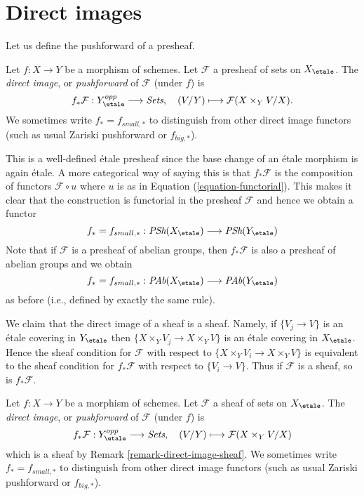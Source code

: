 \section{Direct images}
\label{section-direct-image}

\noindent
Let us define the pushforward of a presheaf.

\begin{definition}
\label{definition-direct-image-presheaf}
Let $f: X\to Y$ be a morphism of schemes.
Let $\mathcal{F} $ a presheaf of sets on $X_\etale$.
The {\it direct image}, or {\it pushforward} of $\mathcal{F}$
(under $f$) is
$$
f_*\mathcal{F} : Y_\etale^{opp} \longrightarrow \textit{Sets}, \quad
(V/Y) \longmapsto \mathcal{F}(X \times_Y V/X).
$$
We sometimes write $f_* = f_{small, *}$ to distinguish from other
direct image functors (such as usual Zariski pushforward or $f_{big, *}$).
\end{definition}

\noindent
This is a well-defined \'etale presheaf since the base change of an \'etale
morphism is again \'etale. A more categorical way of saying this is that
$f_*\mathcal{F}$ is the composition of functors $\mathcal{F} \circ u$
where $u$ is as in Equation (\ref{equation-functorial}). This makes it
clear that the construction is functorial in the presheaf
$\mathcal{F}$ and hence we obtain a functor
$$
f_* = f_{small, *} :
\textit{PSh}(X_\etale)
\longrightarrow
\textit{PSh}(Y_\etale)
$$
Note that if $\mathcal{F}$ is a presheaf of abelian groups, then
$f_*\mathcal{F}$ is also a presheaf of abelian groups and we obtain
$$
f_* = f_{small, *} :
\textit{PAb}(X_\etale)
\longrightarrow
\textit{PAb}(Y_\etale)
$$
as before (i.e., defined by exactly the same rule).

\begin{remark}
\label{remark-direct-image-sheaf}
We claim that the direct image of a sheaf is a sheaf.
Namely, if $\{V_j \to V\}$ is an \'etale covering in $Y_\etale$
then $\{X \times_Y V_j \to X \times_Y V\}$ is an \'etale covering in
$X_\etale$. Hence the sheaf condition for $\mathcal{F}$ with respect
to $\{X \times_Y V_i \to X \times_Y V\}$
is equivalent to the sheaf condition for $f_*\mathcal{F}$ with respect to
$\{V_i \to V\}$. Thus if $\mathcal{F}$ is a sheaf, so is
$f_*\mathcal{F}$.
\end{remark}

\begin{definition}
\label{definition-direct-image-sheaf}
Let $f: X\to Y$ be a morphism of schemes.
Let $\mathcal{F} $ a sheaf of sets on $X_\etale$.
The {\it direct image}, or {\it pushforward} of $\mathcal{F}$
(under $f$) is
$$
f_*\mathcal{F} : Y_\etale^{opp} \longrightarrow \textit{Sets}, \quad
(V/Y) \longmapsto \mathcal{F}(X \times_Y V/X)
$$
which is a sheaf by
Remark \ref{remark-direct-image-sheaf}.
We sometimes write $f_* = f_{small, *}$ to distinguish from other
direct image functors (such as usual Zariski pushforward or $f_{big, *}$).
\end{definition}


